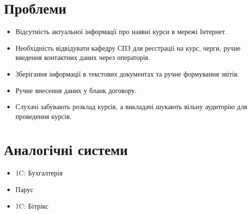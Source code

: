 \section*{Проблеми}

\begin{itemize}
 \item Відсутність актуальної інформації про наявні курси в мережі Інтернет.
 \item Необхідність відвідувати кафедру СПЗ для реєстрації на курс, черги, ручне введення контактних даних через операторів.
 \item Зберігання інформації в текстових документах та ручне формування звітів.
 \item Ручне внесення даних у бланк договору.
 \item Слухачі забувають розклад курсів, а викладачі шукають вільну аудиторію для проведення курсів.
\end{itemize}

\section*{Аналогічні системи}

\begin{itemize}
 \item 1C: Бухгалтерія
 \item Парус
 \item 1C: Бітрікс
\end{itemize}

